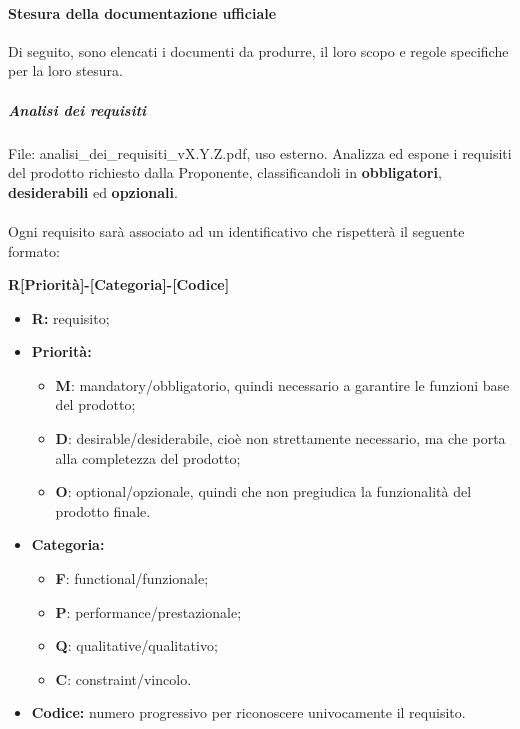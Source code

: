 		\paragraph{Stesura della documentazione ufficiale}
        Di seguito, sono elencati i documenti da produrre, il loro scopo e regole specifiche per la loro stesura.
            \subparagraph{Analisi dei requisiti}
            File: analisi\_dei\_requisiti\_vX.Y.Z.pdf, uso esterno. Analizza ed espone i requisiti del prodotto richiesto dalla Proponente, classificandoli in \textbf{obbligatori}, \textbf{desiderabili} ed \textbf{opzionali}.
            \\\\
            Ogni requisito sarà associato ad un identificativo che rispetterà il seguente formato:
            \begin{center}
                \textbf{R[Priorità]-[Categoria]-[Codice]}
            \end{center}
            \begin{itemize}
                \item \textbf{R:} requisito;
                \item \textbf{Priorità:}
                \begin{itemize}
                    \item \textbf{M}: mandatory/obbligatorio, quindi necessario a garantire le funzioni base del prodotto;
                    \item \textbf{D}: desirable/desiderabile, cioè non strettamente necessario, ma che porta alla completezza del prodotto;
                    \item \textbf{O}: optional/opzionale, quindi che non pregiudica la funzionalità del prodotto finale.
                \end{itemize}
                \item \textbf{Categoria:}
                \begin{itemize}
                    \item \textbf{F}: functional/funzionale;
                    \item \textbf{P}: performance/prestazionale;
                    \item \textbf{Q}: qualitative/qualitativo;
                    \item \textbf{C}: constraint/vincolo.
                \end{itemize}
                \item \textbf{Codice:} numero progressivo per riconoscere univocamente il requisito.
            \end{itemize}
